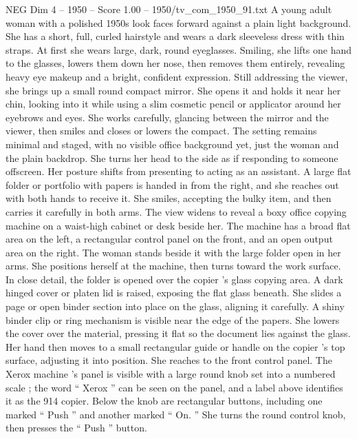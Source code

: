 \begin{textsample}{NEG Dim 4 – 1950 – Score 1.00 – 1950/tv\_com\_1950\_91.txt}  \label{ex:f4_neg_068}
A young adult woman with a polished 1950s look faces forward against a plain light background.
She has a short, full, curled hairstyle and wears a dark sleeveless dress with thin straps.
At first she wears large, dark, round eyeglasses.
Smiling, she lifts one hand to the glasses, lowers them down her nose, then removes them entirely, revealing heavy eye makeup and a bright, confident expression.
Still addressing the viewer, she brings up a small round compact mirror.
She opens it and holds it near her chin, looking into it while using a slim cosmetic pencil or applicator around her eyebrows and eyes.
She works carefully, glancing between the mirror and the viewer, then smiles and closes or lowers the compact.
The setting remains minimal and staged, with no visible office background yet, just the woman and the plain backdrop.
She turns her head to the side as if responding to someone offscreen.
Her posture shifts from presenting to acting as an assistant.
A large flat folder or portfolio with papers is handed in from the right, and she reaches out with both hands to receive it.
She smiles, accepting the bulky item, and then carries it carefully in both arms.
The view widens to reveal a boxy office copying machine on a waist-high cabinet or desk beside her.
The machine has a broad flat area on the left, a rectangular control panel on the front, and an open output area on the right.
The woman stands beside it with the large folder open in her arms.
She positions herself at the machine, then turns toward the work surface.
In close detail, the folder is opened over the copier ’s glass copying area.
A dark hinged cover or platen lid is raised, exposing the flat glass beneath.
She slides a page or open binder section into place on the glass, aligning it carefully.
A shiny binder clip or ring mechanism is visible near the edge of the papers.
She lowers the cover over the material, pressing it flat so the document lies against the glass.
Her hand then moves to a small rectangular guide or handle on the copier ’s top surface, adjusting it into position.
She reaches to the front control panel.
The Xerox machine ’s panel is visible with a large round knob set into a numbered scale ; the word “ Xerox ” can be seen on the panel, and a label above identifies it as the 914 copier.
Below the knob are rectangular buttons, including one marked “ Push ” and another marked “ On. ” She turns the round control knob, then presses the “ Push ” button.

\end{textsample}
